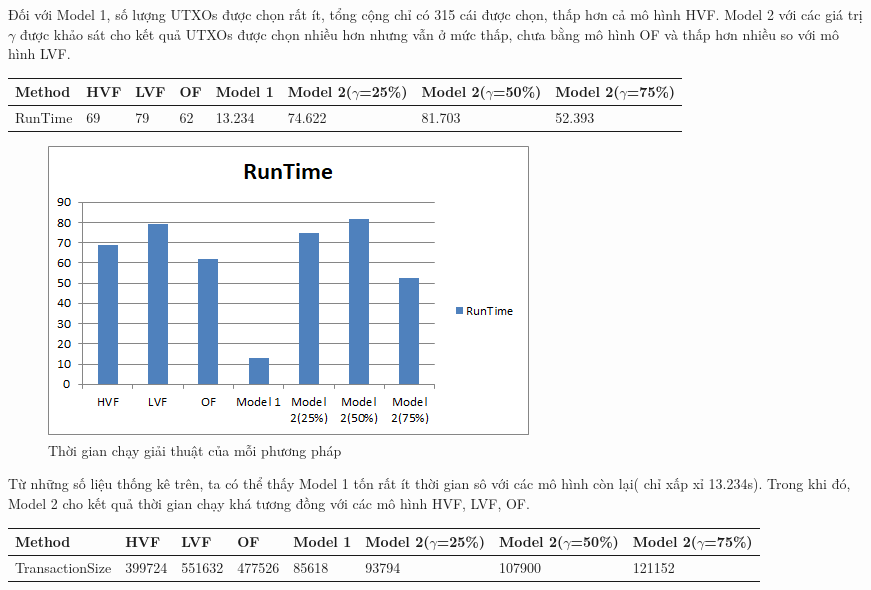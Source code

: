 \documentclass[a4paper]{article}
\begin{document}
Đối với Model 1, số lượng UTXOs được chọn rất ít, tổng cộng chỉ có 315 cái được chọn, thấp hơn cả mô hình HVF. Model 2 với các giá trị $\gamma$ được khảo sát cho kết quả UTXOs được chọn nhiều hơn nhưng vẫn ở mức thấp, chưa bằng mô hình OF và thấp hơn nhiều so với mô hình LVF.

\begin{table}[ht]
	\begin{tabular}{|l|l|l|l|l|l|l|l|}
		\hline
		Method  & HVF & LVF & OF & Model 1 & Model 2($\gamma$=25\%) & Model 2($\gamma$=50\%) & Model 2($\gamma$=75\%) \\ \hline
		RunTime & 69  & 79  & 62 & 13.234  & 74.622        & 81.703        & 52.393        \\ \hline
	\end{tabular}
\end{table}

\begin{center}
	\begin{figure} [ht]
		\begin{center}
			\includegraphics[scale=1]{RunTime}
		\end{center}
		\caption{Thời gian chạy giải thuật của mỗi phương pháp}
		\label{refhinh1}
	\end{figure}
\end{center}

Từ những số liệu thống kê trên, ta có thể thấy Model 1 tốn rất ít thời gian sô với các mô hình còn lại( chỉ xấp xỉ 13.234s). Trong khi đó, Model 2 cho kết quả thời gian chạy khá tương đồng với các mô hình HVF, LVF, OF.

\begin{table}[ht]
	\begin{tabular}{|l|l|l|l|l|l|l|l|}
		\hline
		Method  & HVF & LVF & OF & Model 1 & Model 2($\gamma$=25\%) & Model 2($\gamma$=50\%) & Model 2($\gamma$=75\%) \\ \hline
		TransactionSize & 399724 & 551632 & 477526 & 85618   & 93794         & 107900        & 121152        \\ \hline
	\end{tabular}
\end{table}
\end{document}
